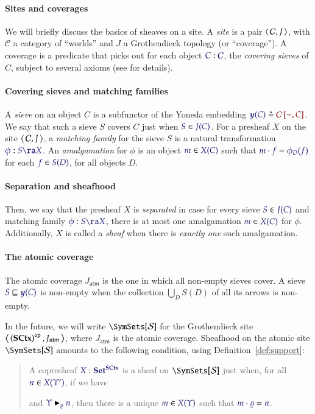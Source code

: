 \documentclass[11pt]{article}
\theoremstyle{definition}
\theoremstyle{remark}
\numberwithin{equation}{section}
\newcommand\SupportsUnmoded[3]{#1 \blacktriangleright_{#2} #3}
\newcommand\Supports[3]{\SupportsUnmoded{\IMode{#1}}{\IMode{#2}}{\IMode{#3}}}
\newcommand\SCtxSite{\SymSets[\Sorts]}
\begin{document}
\paragraph{Sites and coverages}

We will briefly discuss the basics of sheaves on a site. A \emph{site} is a
pair $\left\langle\,\mathcal{C},J\,\right\rangle$, with $\mathcal{C}$ a category of ``worlds'' and
$J$ a Grothendieck topology (or ``coverage''). A coverage is a predicate that
picks out for each object $\Of{C}{\mathcal{C}}$, the \emph{covering sieves} of
$C$, subject to several axioms (see \cite{mac-lane-moerdijk:1992} for details).

\paragraph{Covering sieves and matching families}

A \emph{sieve} on an object $C$ is a subfunctor of the Yoneda embedding
$\Define{\Yoneda{C}}{\Hom{\mathcal{C}}{-}{C}}$. We say that such a sieve $S$
covers $C$ just when $\Member{S}{J(C)}$.  For a presheaf $X$ on the site
$\left\langle\,\mathcal{C},J\,\right\rangle$, a \emph{matching family} for the sieve $S$ is a
natural transformation $\Of{\phi}{S\ra X}$. An \emph{amalgamation} for $\phi$
is an object $\Member{m}{X(C)}$ such that $\IsEq{m\cdot f}{\phi_D(f)}$ for each
$\Member{f}{S(D)}$, for all objects $D$.

\paragraph{Separation and sheafhood}
Then, we say that the presheaf $X$ is \emph{separated} in case for every sieve
$\Member{S}{J(C)}$ and matching family $\Of{\phi}{S\ra X}$, there is at most
one amalgamation $\Member{m}{X(C)}$ for $\phi$. Additionally, $X$ is called a
\emph{sheaf} when there is \emph{exactly one} such amalgamation.

\paragraph{The atomic coverage}

The atomic coverage $J_\mathsf{atm}$ is the one in which all non-empty sieves
cover. A sieve $\IMode{S}\sqsubseteq\IMode{\Yoneda{C}}$ is non-empty when the
collection $\bigcup_D S(D)$ of all its arrows is non-empty.

In the future, we will write $\SCtxSite$ for the Grothendieck site
$\left\langle\,\left(\mathbf{SCtx}\right)^{\mathtt{op}},J_\mathsf{atm}\,\right\rangle$, where $J_\mathsf{atm}$ is
the atomic coverage. Sheafhood on the atomic site $\SCtxSite$ amounts to the
following condition, using Definition~\ref{def:support}:
\begin{quote}
  A copresheaf $\Of{X}{\Sets^\SCtx}$ is a sheaf on $\SCtxSite$ just when, for all $\Member{n}{X(\Upsilon')}$, if we have
  and $\Supports{\Upsilon}{\varrho}{n}$, then there is a unique
  $\Member{m}{X(\Upsilon)}$ such that $\IsEq{m\cdot\varrho}{n}$.
\end{quote}
\end{document}
